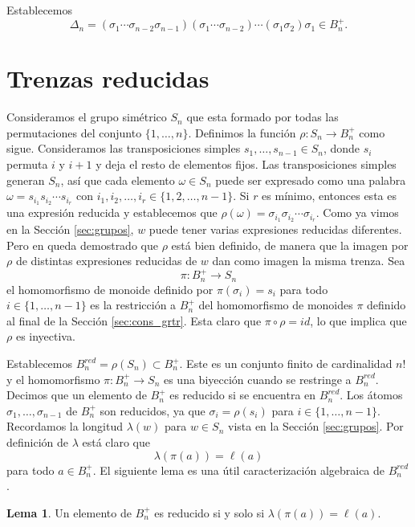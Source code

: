 \documentclass[12pt]{book}
\theoremstyle{definition}
\newtheorem{lema}{Lema}[section]
\begin{document}
Establecemos
$$\Delta_n = (\sigma_1\cdots\sigma_{n-2}\sigma_{n-1})(\sigma_1\cdots\sigma_{n-2})\cdots(\sigma_1\sigma_2)\sigma_1\in B_n^+.$$

\section{Trenzas reducidas}

Consideramos el grupo simétrico $S_n$ que esta formado por todas las permutaciones del conjunto $\{1,\ldots,n\}$. Definimos la función $\rho:S_n\rightarrow B_n^+$ como sigue. Consideramos las transposiciones simples $s_1,\ldots,s_{n-1}\in S_n$, donde $s_i$ permuta $i$ y $i+1$ y deja el resto de elementos fijos. Las transposiciones simples generan $S_n$, así que cada elemento $\omega\in S_n$ puede ser expresado como una palabra $\omega = s_{i_1}s_{i_2}\cdots s_{i_r}$ con $i_1,i_2,\ldots,i_r\in\{1,2,\ldots,n-1\}$. Si $r$ es mínimo, entonces esta es una expresión reducida y establecemos que $\rho(\omega)=\sigma_{i_1}\sigma_{i_2}\cdots \sigma_{i_r}$. Como ya vimos en la Sección \ref{sec:grupos}, $w$ puede tener varias expresiones reducidas diferentes. Pero en \cite{br_gr} queda demostrado que $\rho$ está bien definido, de manera que la imagen por $\rho$ de distintas expresiones reducidas de $w$ dan como imagen la misma trenza. Sea
$$\pi:B_n^+\rightarrow S_n$$
el homomorfismo de monoide definido por $\pi(\sigma_i)=s_i$ para todo $i\in\{1,\ldots,n-1\}$ es la restricción a $B_n^+$ del homomorfismo de monoides $\pi$ definido al final de la Sección \ref{sec:cons_grtr}. Esta claro que $\pi\circ\rho = id$, lo que implica que $\rho$ es inyectiva.

Establecemos $B_n^{red}=\rho(S_n)\subset B_n^+$. Este es un conjunto finito de cardinalidad $n!$ y el homomorfismo $\pi:B_n^+\rightarrow S_n$ es una biyección cuando se restringe a $B_n^{red}$. Decimos que un elemento de $B_n^+$ es reducido si se encuentra en $B_n^{red}$. Los átomos $\sigma_1,\ldots,\sigma_{n-1}$ de $B_n^+$ son reducidos, ya que $\sigma_i=\rho(s_i)$ para $i\in\{1,\ldots,n-1\}$. Recordamos la longitud $\lambda(w)$ para $w\in S_n$ vista en la Sección \ref{sec:grupos}. Por definición de $\lambda$ está claro que
$$\lambda(\pi(a))=\ell(a)$$
para todo $a\in B_n^+$. El siguiente lema es una útil caracterización algebraica de $B_n^{red}$.

\begin{lema}
Un elemento de $B_n^+$ es reducido si y solo si $\lambda(\pi(a))=\ell(a)$.
\label{lema:reduced1}
\end{lema}
\end{document}
